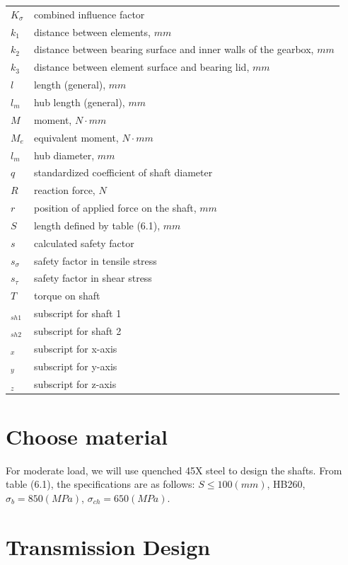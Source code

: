 \begin{tabular}{lp{6.5cm}}
	$ K_\sigma $ & combined influence factor\\
	$ k_1 $ & distance between elements, $ \unit{mm} $\\
	$ k_2 $ & distance between bearing surface and inner walls of the gearbox, $ \unit{mm} $\\
	$ k_3 $ & distance between element surface and bearing lid, $ \unit{mm} $\\
	$ l $ & length (general), $ \unit{mm} $\\
	$ l_m $ & hub length (general), $ \unit{mm} $\\
	$ M $ & moment, $ \unit{N\cdot mm} $\\
	$ M_e $ & equivalent moment, $ \unit{N\cdot mm} $\\
	$ l_m $ & hub diameter, $ \unit{mm} $\\
	$ q $ & standardized coefficient of shaft diameter\\
	$ R $ & reaction force, $ \unit{N} $\\
	$ r $ & position of applied force on the shaft, $\unit{mm}$\\
	$ S $ & length defined by table (6.1), $ \unit{mm} $\\
	$ s $ & calculated safety factor\\
	$ s_\sigma $ & safety factor in tensile stress\\
	$ s_\tau $ & safety factor in shear stress\\
	$ T $ & torque on shaft\\
	$ _{sh1} $ & subscript for shaft 1\\
	$ _{sh2} $ & subscript for shaft 2\\
	$ _x $ & subscript for x-axis\\
	$ _y $ & subscript for y-axis\\
	$ _z $ & subscript for z-axis\\
\end{tabular}
\section{Choose material}
For moderate load, we will use quenched 45X steel to design the shafts. From table (6.1), the specifications are as follows: $ S \leq 100\unit{(mm)} $, HB260, $ \sigma_b = 850\unit{(MPa)}$, $ \sigma_{ch} = 650\unit{(MPa)}$. 

\section{Transmission Design}
